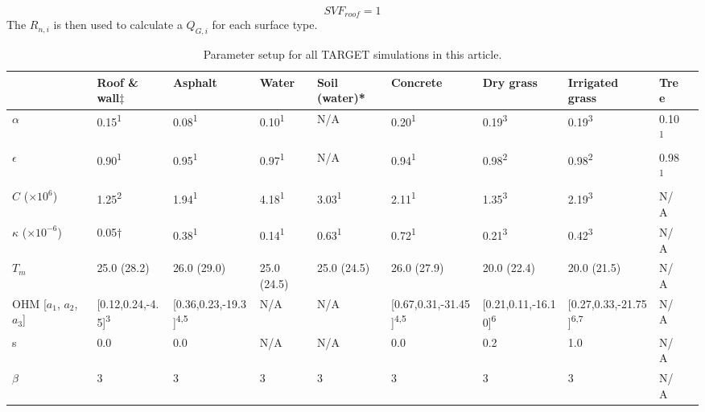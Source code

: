 \documentclass[journal abbreviation, manuscript]{copernicus}
\begin{document}
\begin{equation}
SVF_{roof} = 1
\end{equation} The $R_{n,i}$ is then used to calculate a \ensuremath{Q_{G,i}} for each surface type.

\begin{table}
\begin{center}

\caption{Parameter setup for all TARGET simulations in this article.}  
\label{tab:Parameter}
  \begin{tabular}{  p{2.5cm} p{1.3cm} p{1.3cm} p{1.3cm} p{1.3cm} p{1.3cm} p{1.3cm} p{1.3cm} p{1.3cm} p{1.3cm}} 
	\hline  \textbf{ } & \textbf{Roof \& wall$\ddagger$} & \textbf{Asphalt}& \textbf{Water}& \textbf{Soil 
	(water)*}& \textbf{Concrete}& \textbf{Dry grass}& \textbf{Irrigated grass} & \textbf{Tree} \\ 	
\hline	
\ensuremath{\alpha}                             & 0.15\textsuperscript{1}         & 0.08\textsuperscript{1}  & 0.10\textsuperscript{1}  & N/A   & 0.20\textsuperscript{1} & 0.19\textsuperscript{3} & 0.19\textsuperscript{3} & 0.10\textsuperscript{1} \\
\ensuremath{\epsilon}                        & 0.90\textsuperscript{1}        & 0.95\textsuperscript{1}  & 0.97\textsuperscript{1}  & N/A   & 0.94\textsuperscript{1} & 0.98\textsuperscript{2} & 0.98\textsuperscript{2} & 0.98\textsuperscript{1} \\ 
$C$  ($\times10^{6}$)                    & 1.25\textsuperscript{2}         & 1.94\textsuperscript{1}  & 4.18\textsuperscript{1}  & 3.03\textsuperscript{1}  & 2.11\textsuperscript{1} & 1.35\textsuperscript{3} & 2.19\textsuperscript{3} & N/A  \\ 
\ensuremath{\kappa}   ($\times10^{-6}$)                & 0.05$\dagger$& 0.38\textsuperscript{1}  &0.14\textsuperscript{1}   & 0.63\textsuperscript{1}  & 0.72\textsuperscript{1} & 0.21\textsuperscript{3} & 0.42\textsuperscript{3} & N/A  \\ 	
\ensuremath{T_{m}} &25.0  (28.2) & 26.0  (29.0)&25.0 (24.5)&25.0  (24.5)&26.0 (27.9)&20.0  (22.4)&20.0 (21.5) & N/A  \\ 
OHM [\ensuremath{a_{1}}, \ensuremath{a_{2}}, \ensuremath{a_{3}}]&[0.12,0.24,-4.5]\textsuperscript{3}&[0.36,0.23,-19.3]\textsuperscript{4,5}&N/A &N/A&[0.67,0.31,-31.45]\textsuperscript{4,5}&[0.21,0.11,-16.10]\textsuperscript{6}&[0.27,0.33,-21.75]\textsuperscript{6,7} & N/A \\ 
s &0.0&0.0&N/A&N/A&0.0&0.2&1.0&N/A \\ 
\ensuremath{\beta}&3&3&3&3&3&3&3&N/A \\ 



\end{tabular}
\end{center}
\end{table}
\end{document}

